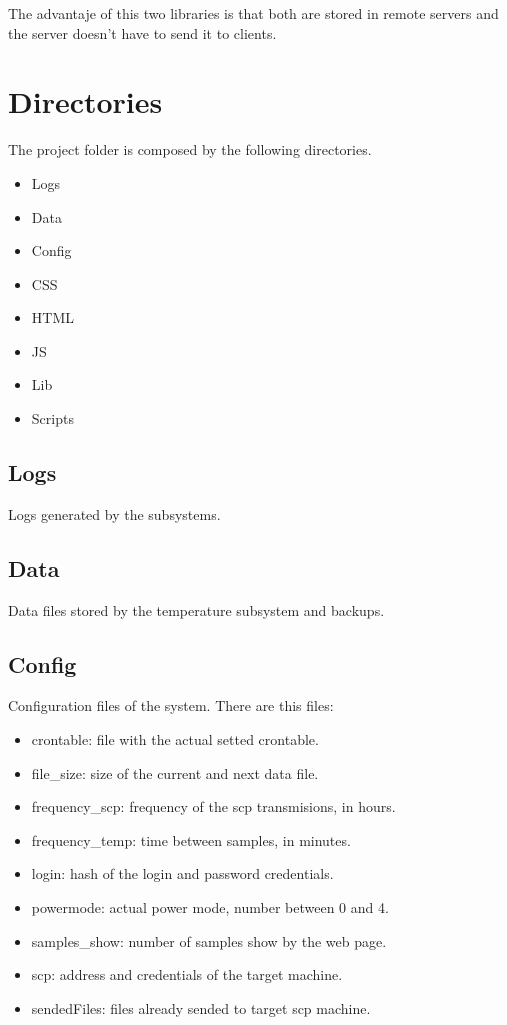 		The advantaje of this two libraries is that both are stored in remote servers and the server doesn't have to send it to clients.

	\section{Directories} %
	The project folder is composed by the following directories.
		\begin{itemize}
			\item Logs
			\item Data
			\item Config
			\item CSS
			\item HTML
			\item JS
			\item Lib
			\item Scripts
		\end{itemize}
	\subsection{Logs}
	Logs generated by the subsystems.
	\subsection{Data}
	Data files stored by the temperature subsystem and backups.
	\subsection{Config}
	Configuration files of the system. There are this files:
		\begin{itemize}
			\item crontable: file with the actual setted crontable.
			\item file\_size: size of the current and next data file.
			\item frequency\_scp: frequency of the scp transmisions, in hours.
			\item frequency\_temp: time between samples, in minutes.
			\item login: hash of the login and password credentials.
			\item powermode: actual power mode, number between 0 and 4.
			\item samples\_show: number of samples show by the web page.
			\item scp: address and credentials of the target machine.
			\item sendedFiles: files already sended to target scp machine.
		\end{itemize}
